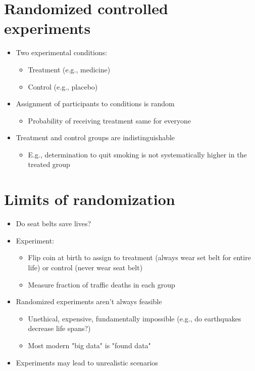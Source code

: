 \documentclass[11pt]{article}
\begin{document}
\section*{Randomized controlled experiments}
\begin{itemize}
	\item Two experimental conditions:
		\begin{itemize}
			\item Treatment (e.g., medicine)
			\item Control (e.g., placebo)
		\end{itemize}
	\item Assignment of participants to conditions is random
		\begin{itemize}
			\item Probability of receiving treatment same for everyone
		\end{itemize}
	\item Treatment and control groups are indistinguishable
		\begin{itemize}
			\item E.g., determination to quit smoking is not systematically higher in the treated group
		\end{itemize}
\end{itemize}

\section*{Limits of randomization}

\begin{itemize}
	\item Do seat belts save lives?
	\item Experiment:
		\begin{itemize}
			\item Flip coin at birth to assign to treatment (always wear set belt for entire life) or control (never wear seat belt)
			\item Measure fraction of traffic deaths in each group
		\end{itemize}
	\item Randomized experiments aren't always feasible
		\begin{itemize}
			\item Unethical, expensive, fundamentally impossible (e.g., do earthquakes decrease life spans?)
			\item Most modern "big data" is "found data"
		\end{itemize}
	\item Experiments may lead to unrealistic scenarios	
\end{itemize}
\end{document}
